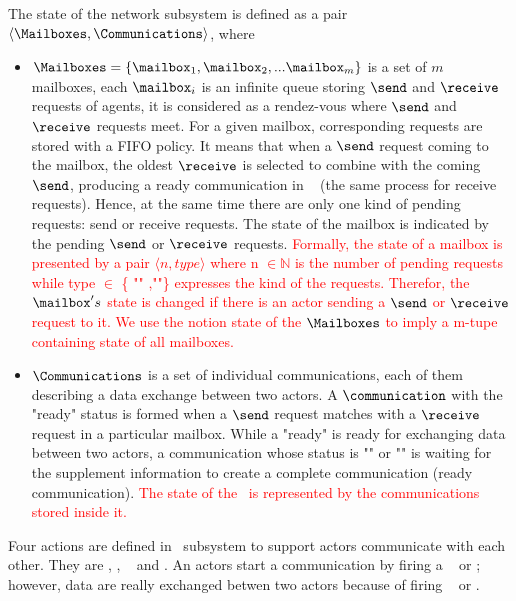 \documentclass[a4paper,11pt]{article}
\begin{document}
The state of the network subsystem is defined as a pair $\langle \Mailboxes, \Communications \rangle$, where \begin{itemize}[noitemsep]
\setlength{\itemsep}{3pt}
\item $\Mailboxes = \{ \mailbox_1, \mailbox_2, ... \mailbox_m \}$ is a set of $m$ mailboxes, each $\mailbox_i$ is an infinite queue storing $\send$ and $\receive$ requests of agents, it is considered as a rendez-vous
where $\send$ and $\receive$ requests meet. For a given mailbox, corresponding requests are stored with a FIFO policy. It means that when a $\send$ request coming to the mailbox, the oldest $\receive$ is selected to combine with the coming $\send$, producing a ready communication in \Communications~ (the same process for receive requests). Hence, at the same time there are only one kind of pending requests: send or receive requests. The state of the mailbox is indicated by the pending $\send$ or $\receive$ requests. \textcolor{red}{Formally, the state of a mailbox is presented by a pair $\langle n,type \rangle$ where n $\in \mathbb{N}$ is the number of pending requests while type $\in$ \{ "\send" ,"\receive"\} expresses the kind of the requests. Therefor, the $\mailbox's$ state is changed if there is an actor sending a $\send$ or $\receive$ request to it. We use the notion state of the $\Mailboxes$ to imply a m-tupe containing state of all mailboxes. }
\item $\Communications$ is a set of individual communications, each of them describing a data exchange  between two actors.  A $\communication$ with the "ready" status is formed when a $\send$ request matches with a $\receive$ request in a particular mailbox. While a "ready" \communication is ready for exchanging data between two actors, a communication whose status is "\send" or "\receive" is waiting for the supplement information to create a complete communication (ready communication).\textcolor{red}{ The state of the \Communications~is represented by the communications stored inside it. }
\end{itemize}
Four actions are defined in \Network~subsystem to support actors communicate with each other. They are \asynsend, \asynreceive, \wait~ and \test. An actors start a communication by firing a \asynsend~ or \asynreceive; however, data are really exchanged betwen two actors because of firing \wait~ or \test.
\end{document}
